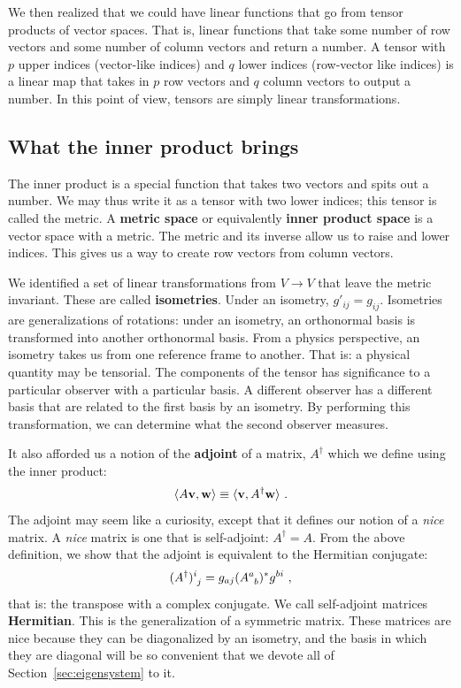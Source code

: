\documentclass[12pt]{article}
\begin{document}
We then realized that we could have linear functions that go from tensor products of vector spaces. That is, linear functions that take some number of row vectors and some number of column vectors and return a number. A tensor with $p$ upper indices (vector-like indices) and $q$ lower indices (row-vector like indices) is a linear map that takes in $p$ row vectors and $q$ column vectors to output a number. In this point of view, tensors are simply linear transformations. 

\subsection{What the inner product brings}

The inner product is a special function that takes two vectors and spits out a number. We may thus write it as a tensor with two lower indices; this tensor is called the metric. A \textbf{metric space} or equivalently \textbf{inner product space} is a vector space with a metric. The metric and its inverse allow us to raise and lower indices. This gives us a way to create row vectors from column vectors. 

We identified a set of linear transformations from $V\to V$ that leave the metric invariant. These are called \textbf{isometries}. Under an isometry, $g'_{ij} = g_{ij}$. Isometries are generalizations of rotations: under an isometry, an orthonormal basis is transformed into another orthonormal basis. From a physics perspective, an isometry takes us from one reference frame to another. That is: a physical quantity may be tensorial. The components of the tensor has significance to a particular observer with a particular basis. A different observer has a different basis that are related to the first basis by an isometry. By performing this transformation, we can determine what the second observer measures.

It also afforded us a notion of the \textbf{adjoint} of a matrix, $A^\dag$ which we define using the inner product:
\begin{align}
    \langle A \mathbf{v}, \mathbf{w} \rangle 
    \equiv
    \langle \mathbf{v}, A^\dag\mathbf{w} \rangle  \ .
\end{align}
The adjoint may seem like a curiosity, except that it defines our notion of a \emph{nice} matrix. A \emph{nice} matrix is one that is self-adjoint: $A^\dag = A$. From the above definition, we show that the adjoint is equivalent to the Hermitian conjugate: 
\begin{align}
    (A^\dag)\aij{i}{j} = g_{aj}(A\aij{a}{b})^*g^{bi} \ ,
\end{align}
that is: the transpose with a complex conjugate. We call self-adjoint matrices \textbf{Hermitian}. This is the generalization of a symmetric matrix. These matrices are nice because they can be diagonalized by an isometry, and the basis in which they are diagonal will be so convenient that we devote all of Section~\ref{sec:eigensystem} to it.
\end{document}
